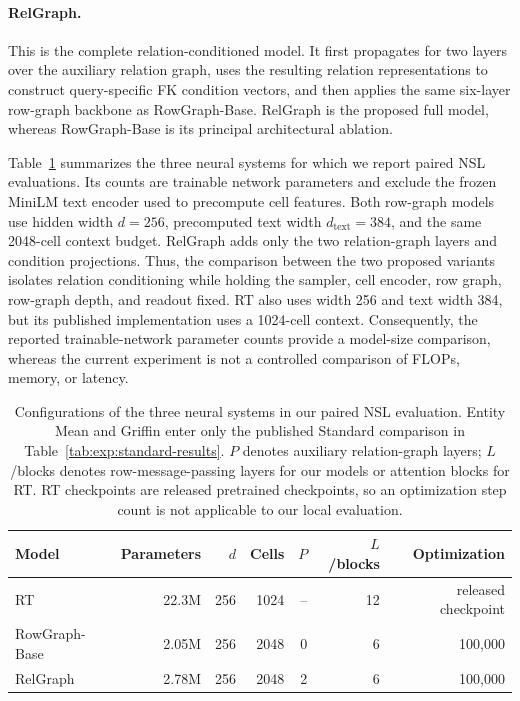 \paragraph{RelGraph.}
This is the complete relation-conditioned model. It first propagates for
two layers over the auxiliary relation graph, uses the resulting relation
representations to construct query-specific FK condition vectors, and then
applies the same six-layer row-graph backbone as RowGraph-Base. RelGraph is
the proposed full model, whereas RowGraph-Base is its principal architectural
ablation.

Table~\ref{tab:exp:model-configurations} summarizes the three neural systems
for which we report paired NSL evaluations. Its
counts are trainable network parameters and exclude the frozen MiniLM text
encoder used to precompute cell features. Both
row-graph models use hidden width \(d=256\), precomputed text width
\(d_{\mathrm{text}}=384\), and the same 2048-cell context budget. RelGraph
adds only the two relation-graph layers and condition projections. Thus, the
comparison between the two proposed variants isolates relation conditioning
while holding the sampler, cell encoder, row graph, row-graph depth, and
readout fixed. RT also uses width 256 and text width 384, but its published
implementation uses a 1024-cell context. Consequently, the reported
trainable-network parameter counts provide a model-size comparison, whereas
the current experiment is not a controlled comparison of FLOPs, memory, or
latency.

\begin{table}[t]
  \centering
  \caption{Configurations of the three neural systems in our paired NSL
  evaluation. Entity Mean and Griffin enter only the published Standard
  comparison in Table~\ref{tab:exp:standard-results}.
  \(P\) denotes auxiliary relation-graph layers; \(L\)/blocks denotes
  row-message-passing layers for our models or attention blocks for RT.
  RT checkpoints are released pretrained checkpoints, so an optimization
  step count is not applicable to our local evaluation.}
  \label{tab:exp:model-configurations}
  \footnotesize
  \setlength{\tabcolsep}{4pt}
  \begin{tabular}{lrrrrrr}
    \toprule
    Model & Parameters & \(d\) & Cells & \(P\) &
    \(L\)/blocks & Optimization \\
    \midrule
    RT & 22.3M & 256 & 1024 & -- & 12 & released checkpoint \\
    RowGraph-Base & 2.05M & 256 & 2048 & 0 & 6 & 100,000 \\
    RelGraph & 2.78M & 256 & 2048 & 2 & 6 & 100,000 \\
    \bottomrule
  \end{tabular}
\end{table}

